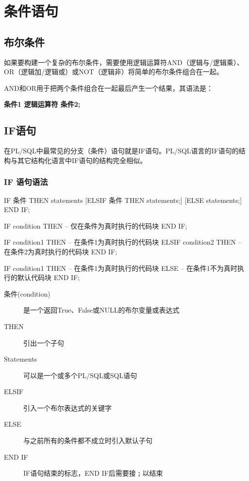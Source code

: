 \documentclass[11pt, a4paper, oneside, UTF8]{ctexbook}
\let\kaishu\relax %
\begin{document}
\chapter{条件语句}
\section{布尔条件}
如果要构建一个复杂的布尔条件，需要使用逻辑运算符AND（逻辑与/逻辑乘）、OR（逻辑加/逻辑或）或NOT（逻辑非）将简单的布尔条件组合在一起。

AND和OR用于把两个条件组合在一起最后产生一个结果，其语法是：

{\bfseries\kaishu 条件1 逻辑运算符 条件2;}

\section{IF语句}
在PL/SQL中最常见的分支（条件）语句就是IF语句。PL/SQL语言的IF语句的结构与其它结构化语言中IF语句的结构完全相似。

\subsection{IF 语句语法}
\begin{plsql}[caption=IF语法]
IF 条件 THEN
  statements
[ELSIF 条件 THEN
  statements;]
[ELSE
  statements;]
END IF;
\end{plsql}

\begin{plsql}[caption=IF语法示例1]
IF condition THEN
  -- 仅在条件为真时执行的代码块
END IF;

IF condition1 THEN
  -- 在条件1为真时执行的代码块
ELSIF condition2 THEN
  -- 在条件2为真时执行的代码块
END IF;

IF condition1 THEN
  -- 在条件1为真时执行的代码块
ELSE
  -- 在条件1不为真时执行的默认代码块
END IF;
\end{plsql}

\begin{description}
  \item[条件(condition)] 是一个返回True、False或NULL的布尔变量或表达式
  \item[THEN] 引出一个子句
  \item[Statements] 可以是一个或多个PL/SQL或SQL语句
  \item[ELSIF] 引入一个布尔表达式的关键字
  \item[ELSE] 与之前所有的条件都不成立时引入默认子句
  \item[END IF] IF语句结束的标志，END IF后需要接 \textbf{;} 以结束
\end{description}
\end{document}
